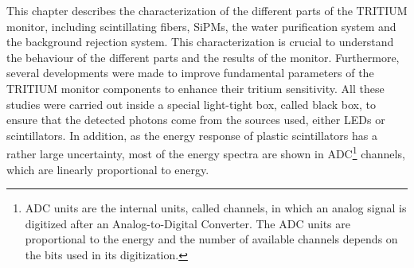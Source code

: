 This chapter describes the characterization of the different parts of the TRITIUM monitor, including scintillating fibers, SiPMs, the water purification system and the background rejection system. This characterization is crucial to understand the behaviour of the different parts and the results of the monitor. Furthermore, several developments were made  to improve fundamental parameters of the TRITIUM monitor components to enhance their tritium sensitivity. All these studies were carried out inside a special light-tight box, called black box, to ensure that the detected photons come from the sources used, either LEDs or scintillators. In addition, as the energy response of plastic scintillators has a rather large uncertainty, most of the energy spectra are shown in ADC\footnote{ADC units are the internal units, called channels, in which an analog signal is digitized after an Analog-to-Digital Converter. The ADC units are proportional to the energy and the number of available channels depends on the bits used in its digitization.} channels, which are linearly proportional to energy.